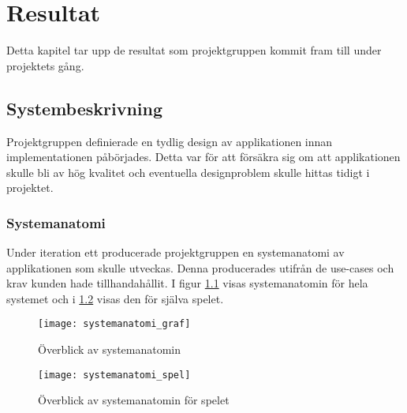 
\chapter{Resultat}
\label{cha:results}

Detta kapitel tar upp de resultat som projektgruppen kommit fram till under projektets gång.

\section{Systembeskrivning}

Projektgruppen definierade en tydlig design av applikationen innan implementationen påbörjades. Detta var för att försäkra sig om att applikationen skulle bli av hög kvalitet och eventuella designproblem skulle hittas tidigt i projektet.

\subsection{Systemanatomi}
\label{beskrivning-systemanatomi}
Under iteration ett producerade projektgruppen en systemanatomi av applikationen som skulle utveckas. Denna producerades utifrån de use-cases och krav kunden hade tillhandahållit. I figur \ref{fig:systemanatomi_graf} visas systemanatomin för hela systemet och i \ref{fig:systemanatomi_spel} visas den för själva spelet.

\begin{figure}[H]
    \centering
    \texttt{[image: systemanatomi\_graf]}
    \caption{Överblick av systemanatomin}
    \label{fig:systemanatomi_graf}
\end{figure}

\begin{figure}[H]
    \centering
    \texttt{[image: systemanatomi\_spel]}
    \caption{Överblick av systemanatomin för spelet}
    \label{fig:systemanatomi_spel}
\end{figure}


